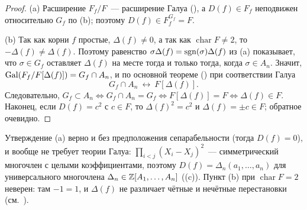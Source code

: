 \begin{proof}
(a) Расширение $F_f/F$~--- расширение Галуа (), а $D(f)\in F_f$ неподвижен относительно $G_f$ по (b);
поэтому $D(f)\in F_f^{G_f}=F$.

(b) Так как корни $f$ простые, $\Delta(f)\ne0$, а так как $\operatorname{char}F\ne2$, то $-\Delta(f)\ne\Delta(f)$. Поэтому
равенство $\sigma\Delta(f)=\operatorname{sgn}(\sigma)\Delta(f)$ из (a) показывает, что $\sigma\in G_f$ оставляет $\Delta(f)$ на месте
тогда и только тогда, когда $\sigma\in A_n$. Значит, $\operatorname{Gal}(F_f/F[\Delta(f)])=G_f\cap A_n$, и по основной теореме ()
при соответствии Галуа
\[
G_f\cap A_n\ \longleftrightarrow\ F[\Delta(f)] .
\]
Следовательно, $G_f\subset A_n\iff G_f\cap A_n=G_f\iff F[\Delta(f)]=F\iff\Delta(f)\in F$. Наконец, если $D(f)=c^2$ с
$c\in F$, то $\Delta(f)^2=c^2$ и $\Delta(f)=\pm c\in F$; обратное очевидно.
\end{proof}

\begin{center}
\begin{keepfig}
\centering
{}
\end{keepfig}
\end{center}

Утверждение (a) верно и без предположения сепарабельности (тогда $D(f)=0$), и вообще не требует теории Галуа:
$\prod_{i<j}(X_i-X_j)^2$~--- симметрический многочлен с целыми коэффициентами, поэтому
$D(f)=\Delta_n(a_1,\dots,a_n)$ для универсального многочлена $\Delta_n\in\mathbb Z[A_1,\dots,A_n]$ ((c)). Пункт (b) при
$\operatorname{char}F=2$ неверен: там $-1=1$, и $\Delta(f)$ не различает чётные и нечётные перестановки (см.\ ).


